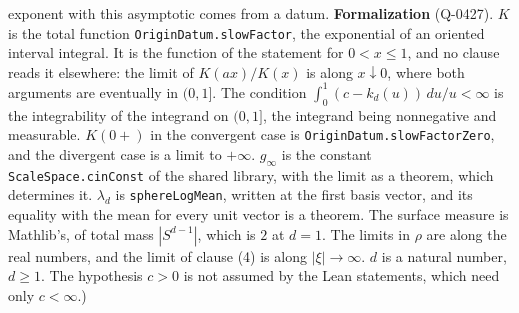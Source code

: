 \begin{proposition}
{exponent with this asymptotic comes from a datum. \textbf{Formalization} (Q-0427). $K$ is the
total function \texttt{OriginDatum.slowFactor}, the exponential of an oriented interval integral.
It is the function of the statement for $0 < x \le 1$, and no clause reads it elsewhere: the
limit of $K(ax)/K(x)$ is along $x \downarrow 0$, where both arguments are eventually in $(0,1]$.
The condition $\int_0^1 (c - k_d(u))\,du/u < \infty$ is the integrability of the integrand on
$(0,1]$, the integrand being nonnegative and measurable. $K(0{+})$ in the convergent case is
\texttt{OriginDatum.slowFactorZero}, and the divergent case is a limit to $+\infty$. $g_\infty$
is the constant \texttt{ScaleSpace.cinConst} of the shared library, with the limit as a theorem,
which determines it. $\lambda_d$ is \texttt{sphereLogMean}, written at the first basis vector,
and its equality with the mean for every unit vector is a theorem. The surface measure is
Mathlib's, of total mass $|S^{d-1}|$, which is $2$ at $d = 1$. The limits in $\rho$ are along the
real numbers, and the limit of clause (4) is along $|\xi| \to \infty$. $d$ is a natural number,
$d \ge 1$. The hypothesis $c > 0$ is not assumed by the Lean statements, which need only
$c < \infty$.)}
\end{proposition}

